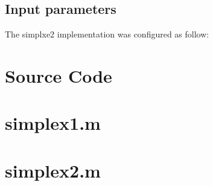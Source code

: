 \documentclass{article}
\begin{document}
\subsection{Input parameters}

The simplxe2 implementation was configured as follow:



\section{Source Code}
\section*{simplex1.m}


\section*{simplex2.m}

\end{document}
